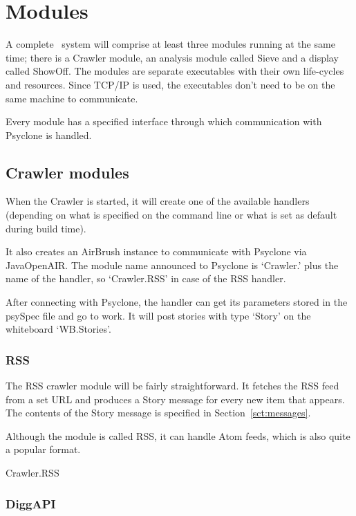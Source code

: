 \section{\label{sct:modules}Modules}

A complete \Amber\ system will comprise at least three modules running at the
same time; there is a Crawler module, an analysis module called Sieve and a
display called ShowOff. The modules are separate executables with their own
life-cycles and resources. Since TCP/IP is used, the executables don't need to
be on the same machine to communicate.

Every module has a specified interface through which communication with
Psyclone is handled.

\subsection{Crawler modules}

When the Crawler is started, it will create one of the available handlers
(depending on what is specified on the command line or what is set as default
during build time). 

It also creates an AirBrush instance to communicate with Psyclone via
Java\-Open\-AIR. The module name announced to Psyclone is `Crawler.' plus the
name of the handler, so `Crawler.RSS' in case of the RSS handler.

After connecting with Psyclone, the handler can get its parameters stored in
the psySpec file and go to work. It will post stories with type `Story'  on the
whiteboard `WB.Stories'.

\subsubsection{RSS}

The RSS crawler module will be fairly straightforward. It fetches the RSS feed
from a set URL and produces a Story message for every new item that appears.
The contents of the Story message is specified in Section~\ref{sct:messages}.

Although the module is called RSS, it can handle Atom feeds, which is also
quite a popular format.

\begin{module}{Crawler.RSS}
\end{module}

\subsubsection{DiggAPI}


